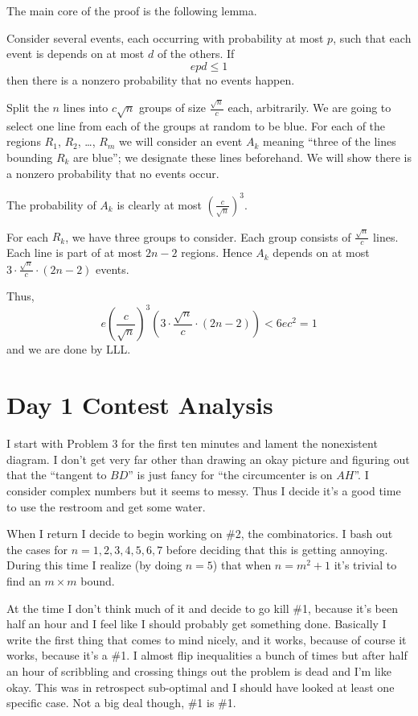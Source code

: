 \documentclass[11pt]{scrreprt}
\numberwithin{figure}{chapter}
\begin{document}
The main core of the proof is the following lemma.
\begin{lemma*}
  Consider several events, each occurring with probability at most $p$, such that
  each event is depends on at most $d$ of the others. If \[ epd \le 1 \]
  then there is a nonzero probability that no events happen.
\end{lemma*}
Split the $n$ lines into $c \sqrt n$ groups of size $\frac{\sqrt n}{c}$ each, arbitrarily.
We are going to select one line from each of the groups at random to be blue.
For each of the regions $R_1$, $R_2$, \dots,
$R_m$ we will consider an event $A_k$ meaning ``three of the lines bounding $R_k$ are blue'';
we designate these lines beforehand.
We will show there is a nonzero probability that no events occur.

The probability of $A_k$ is clearly at most $\left( \frac{c}{\sqrt n} \right)^3$.

For each $R_k$, we have three groups to consider. Each group consists of $\frac{\sqrt n}{c}$ lines.
Each line is part of at most $2n-2$ regions.
Hence $A_k$ depends on at most $3 \cdot \frac{\sqrt n}{c} \cdot (2n-2)$ events.

Thus,
\[ e \left( \frac{c}{\sqrt n} \right)^3 \left( 3 \cdot \frac{\sqrt{n}}{c} \cdot (2n-2) \right)
  < 6ec^2 = 1 \]
and we are done by LLL.


\section{Day 1 Contest Analysis}
I start with Problem 3 for the first ten minutes and lament the nonexistent diagram.
I don't get very far other than drawing an okay picture and figuring out that
the ``tangent to $BD$'' is just fancy for ``the circumcenter is on $AH$''.
I consider complex numbers but it seems to messy.
Thus I decide it's a good time to use the restroom and get some water.

When I return I decide to begin working on \#2, the combinatorics.
I bash out the cases for $n=1,2,3,4,5,6,7$ before deciding that this is getting annoying.
During this time I realize (by doing $n=5$) that when $n=m^2+1$ it's trivial to find an $m \times m$ bound.

At the time I don't think much of it and decide to go kill \#1,
because it's been half an hour and I feel like I should probably get something done.
Basically I write the first thing that comes to mind nicely, and it works, because of course it works,
because it's a \#1. I almost flip inequalities
a bunch of times but after half an hour of scribbling and crossing things out
the problem is dead and I'm like okay.
This was in retrospect sub-optimal and I should have looked at least one specific case.
Not a big deal though, \#1 is \#1.
\end{document}
